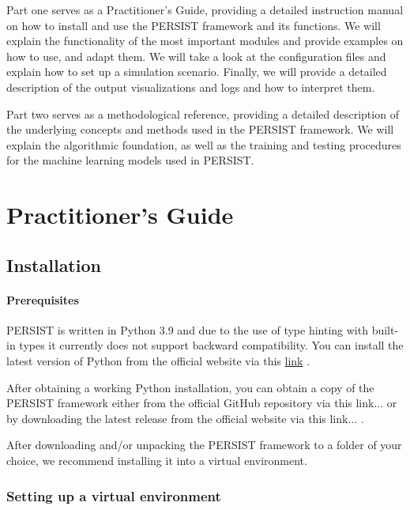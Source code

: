\documentclass[
	a4paper, %
	12pt, %
]{persist}
\begin{document}
Part one serves as a Practitioner's Guide, providing a detailed instruction manual on how to install and use the PERSIST framework and its functions. We will explain the functionality of the most important modules and provide examples on how to use, and adapt them. We will take a look at the configuration files and explain how to set up a simulation scenario. Finally, we will provide a detailed description of the output visualizations and logs and how to interpret them.

Part two serves as a methodological reference, providing a detailed description of the underlying concepts and methods used in the PERSIST framework. We will explain the algorithmic foundation, as well as the training and testing procedures for the machine learning models used in PERSIST.

\section{Practitioner's Guide}

\subsection{Installation}

\paragraph{Prerequisites}

PERSIST is written in Python 3.9 and due to the use of type hinting with built-in types it currently does not support backward compatibility. You can install the latest version of Python from the official website via this \href{https://www.python.org/downloads/}{link} \ExternalLink.

After obtaining a working Python installation, you can obtain a copy of the PERSIST framework either from the official GitHub repository via this link... \ExternalLink or by downloading the latest release from the official website via this link... \ExternalLink.

After downloading and/or unpacking the PERSIST framework to a folder of your choice, we recommend installing it into a virtual environment.

\subsubsection{Setting up a virtual environment}
\end{document}
